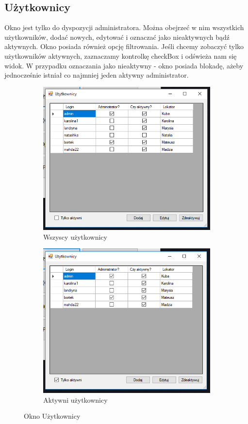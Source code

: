 \documentclass{article}
\begin{document}
\subsection{Użytkownicy}
Okno jest tylko do dyspozycji administratora. Można obejrzeć w nim wszystkich użytkowników, dodać nowych, edytować i oznaczać jako nieaktywnych bądź aktywnych. Okno posiada również opcję filtrowania. Jeśli chcemy zobaczyć tylko użytkowników aktywnych, zaznaczamy kontrolkę checkBox i odświeża nam się widok. W przypadku oznaczania jako nieaktywny - okno posiada blokadę, ażeby jednocześnie istniał co najmniej jeden aktywny administrator.
\begin{figure}[!ht]
\centering
  \begin{subfigure}[b]{0.45\textwidth}
  \includegraphics[width=\textwidth]{users.PNG}
  \caption{Wszyscy użytkownicy}
  \end{subfigure}
  \begin{subfigure}[b]{0.45\textwidth}
  \includegraphics[width=\textwidth]{active.PNG}
  \caption{Aktywni użytkownicy}
  \end{subfigure}
  \caption{Okno Użytkownicy}
\end{figure}
\end{document}
